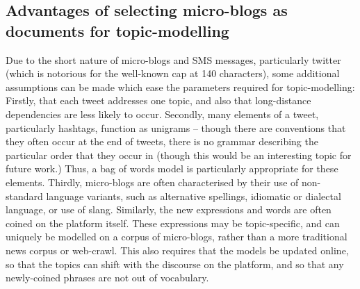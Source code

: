 \documentclass{article}
\begin{document}
\subsection{Advantages of selecting micro-blogs as documents for topic-modelling}
Due to the short nature of micro-blogs and SMS messages, particularly twitter (which is notorious for the well-known cap at 140 characters), some additional assumptions can be made which ease the parameters required for topic-modelling:
Firstly, that each tweet addresses one topic, and also that long-distance dependencies are less likely to occur.
Secondly, many elements of a tweet, particularly hashtags, function as unigrams – though there are conventions that they often occur at the end of tweets, there is no grammar describing the particular order that they occur in (though this would be an interesting topic for future work.)  Thus, a bag of words model is particularly appropriate for these elements.
Thirdly, micro-blogs are often characterised by their use of non-standard language variants, such as alternative spellings, idiomatic or dialectal language, or use of slang. Similarly, the new expressions and words are often coined on the platform itself. These expressions may be topic-specific, and can uniquely be modelled on a corpus of micro-blogs, rather than a more traditional news corpus or web-crawl. This also requires that the models be updated online, so that the topics can shift with the discourse on the platform, and so that any newly-coined phrases are not out of vocabulary.
\end{document}
